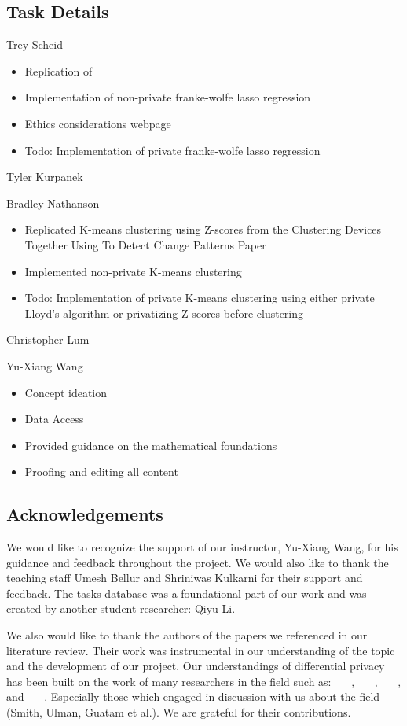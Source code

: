 \documentclass[12pt,letterpaper]{article}
\begin{document}
\subsection{Task Details}

Trey Scheid
\begin{itemize}
    \item Replication of 
    \item Implementation of non-private franke-wolfe lasso regression
    \item Ethics considerations webpage
    \item [ ] Todo: Implementation of private franke-wolfe lasso regression
\end{itemize}

Tyler Kurpanek

Bradley Nathanson
\begin{itemize}
    \item Replicated K-means clustering using Z-scores from the Clustering Devices Together Using To Detect Change Patterns Paper
    \item Implemented non-private K-means clustering 
    \item [ ] Todo: Implementation of private K-means clustering using either private Lloyd's algorithm or privatizing Z-scores before clustering
\end{itemize}

Christopher Lum

Yu-Xiang Wang
\begin{itemize}
  \item Concept ideation
  \item Data Access
  \item Provided guidance on the mathematical foundations
  \item Proofing and editing all content
\end{itemize}


\subsection{Acknowledgements}

We would like to recognize the support of our instructor, Yu-Xiang Wang, for his guidance and feedback throughout the project. We would also like to thank the teaching staff Umesh Bellur and Shriniwas Kulkarni for their support and feedback. The tasks database was a foundational part of our work and was created by another student researcher: Qiyu Li. 

We also would like to thank the authors of the papers we referenced in our literature review. Their work was instrumental in our understanding of the topic and the development of our project. Our understandings of differential privacy has been built on the work of many researchers in the field such as: \_\_, \_\_, \_\_, and \_\_. Especially those which engaged in discussion with us about the field (Smith, Ulman, Guatam et al.). We are grateful for their contributions.
\end{document}
